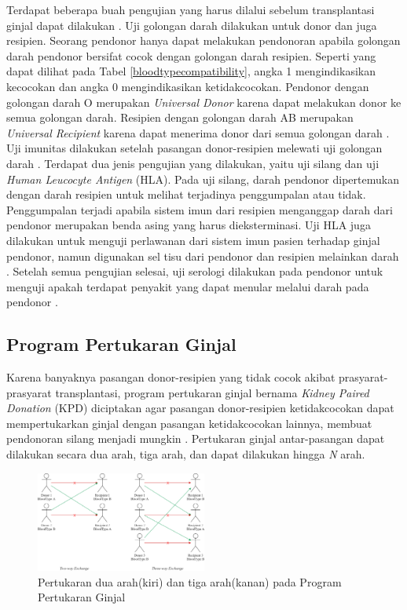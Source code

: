 \documentclass[conference]{IEEEtran}
\begin{document}
Terdapat beberapa buah pengujian yang harus dilalui sebelum transplantasi ginjal dapat dilakukan \cite{adrian}.
Uji golongan darah dilakukan untuk donor dan juga resipien. Seorang pendonor hanya dapat melakukan pendonoran apabila
golongan darah pendonor bersifat cocok dengan golongan darah resipien. Seperti yang dapat dilihat pada Tabel \ref{bloodtypecompatibility},
angka 1 mengindikasikan kecocokan dan angka 0 mengindikasikan ketidakcocokan. Pendonor dengan golongan darah O merupakan
\textit{Universal Donor} karena dapat melakukan donor ke semua golongan darah. Resipien dengan golongan darah AB merupakan
\textit{Universal Recipient} karena dapat menerima donor dari semua golongan darah \cite{charge}.
Uji imunitas dilakukan setelah pasangan donor-resipien melewati uji golongan darah \cite{adrian}. Terdapat dua jenis
pengujian yang dilakukan, yaitu uji silang dan uji \textit{Human Leucocyte Antigen} (HLA). Pada uji silang, darah pendonor
dipertemukan dengan darah resipien untuk melihat terjadinya penggumpalan atau tidak. Penggumpalan terjadi apabila sistem imun
dari resipien menganggap darah dari pendonor merupakan benda asing yang harus dieksterminasi\cite{aprilano}. Uji HLA juga
dilakukan untuk menguji perlawanan dari sistem imun pasien terhadap ginjal pendonor, namun digunakan sel tisu dari pendonor
dan resipien melainkan darah \cite{nguyen}. Setelah semua pengujian selesai, uji serologi dilakukan pada pendonor untuk
menguji apakah terdapat penyakit yang dapat menular melalui darah pada pendonor \cite{aprilano}.

\subsection{Program Pertukaran Ginjal}
Karena banyaknya pasangan donor-resipien yang tidak cocok akibat prasyarat-prasyarat transplantasi, program pertukaran
ginjal bernama \textit{Kidney Paired Donation} (KPD) diciptakan agar pasangan donor-resipien ketidakcocokan dapat mempertukarkan
ginjal dengan pasangan ketidakcocokan lainnya, membuat pendonoran silang menjadi mungkin \cite{raja}. Pertukaran ginjal
antar-pasangan dapat dilakukan secara dua arah, tiga arah, dan dapat dilakukan hingga \textit{N} arah.

\begin{figure}
    \includegraphics[width=0.5\textwidth]{images/kidney-exchange.png}
    \caption{Pertukaran dua arah(kiri) dan tiga arah(kanan) pada Program Pertukaran Ginjal}
\end{figure}
\end{document}

